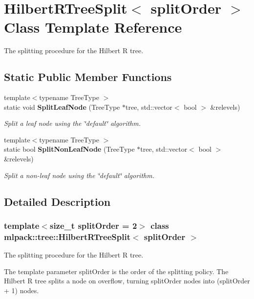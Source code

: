 \section{Hilbert\+R\+Tree\+Split$<$ split\+Order $>$ Class Template Reference}
\label{classmlpack_1_1tree_1_1HilbertRTreeSplit}


The splitting procedure for the Hilbert R tree.  


\subsection*{Static Public Member Functions}
\begin{DoxyCompactItemize}
\item 
{\footnotesize template$<$typename Tree\+Type $>$ }\\static void \textbf{ Split\+Leaf\+Node} (Tree\+Type $\ast$tree, std\+::vector$<$ bool $>$ \&relevels)
\begin{DoxyCompactList}\small\item\em Split a leaf node using the \char`\"{}default\char`\"{} algorithm. \end{DoxyCompactList}\item 
{\footnotesize template$<$typename Tree\+Type $>$ }\\static bool \textbf{ Split\+Non\+Leaf\+Node} (Tree\+Type $\ast$tree, std\+::vector$<$ bool $>$ \&relevels)
\begin{DoxyCompactList}\small\item\em Split a non-\/leaf node using the \char`\"{}default\char`\"{} algorithm. \end{DoxyCompactList}\end{DoxyCompactItemize}


\subsection{Detailed Description}
\subsubsection*{template$<$size\+\_\+t split\+Order = 2$>$\newline
class mlpack\+::tree\+::\+Hilbert\+R\+Tree\+Split$<$ split\+Order $>$}

The splitting procedure for the Hilbert R tree. 

The template parameter split\+Order is the order of the splitting policy. The Hilbert R tree splits a node on overflow, turning split\+Order nodes into (split\+Order + 1) nodes.


